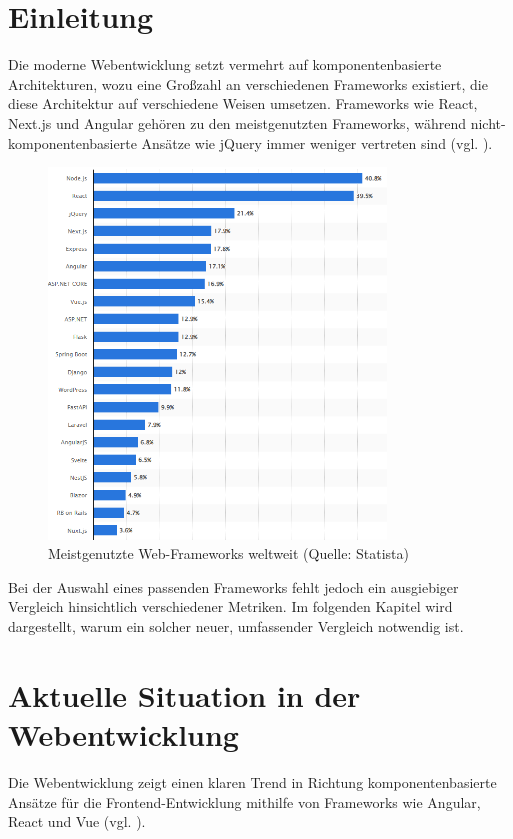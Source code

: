 \documentclass[oneside]{ausarbeitung}
\begin{document}
\section{Einleitung}
Die moderne Webentwicklung setzt vermehrt auf komponentenbasierte Architekturen, wozu eine Großzahl an verschiedenen Frameworks existiert, die diese Architektur auf verschiedene Weisen umsetzen. Frameworks wie React, Next.js und Angular gehören zu den meistgenutzten Frameworks, während nicht-komponentenbasierte Ansätze wie jQuery immer weniger vertreten sind (vgl. \parencite{statista2024}).
\begin{figure}[h]
    \centering
    \includegraphics[width=0.8\textwidth, height=0.5\textheight, keepaspectratio]{images/web-frameworks.png}
    \caption{Meistgenutzte Web-Frameworks weltweit (Quelle: Statista)}
    \label{fig:frameworks}
\end{figure}

Bei der Auswahl eines passenden Frameworks fehlt jedoch ein ausgiebiger Vergleich hinsichtlich verschiedener Metriken. Im folgenden Kapitel wird dargestellt, warum ein solcher neuer, umfassender Vergleich notwendig ist.

\section{Aktuelle Situation in der Webentwicklung}

Die Webentwicklung zeigt einen klaren Trend in Richtung komponentenbasierte Ansätze für die Frontend-Entwicklung mithilfe von Frameworks wie Angular, React und Vue (vgl. \parencite[S. 44]{js-framework-comparison}). 
\end{document}
